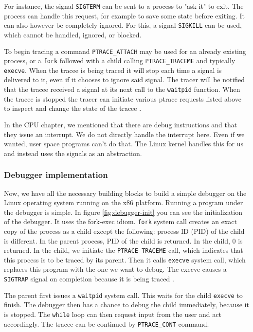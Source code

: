 For instance, the signal \texttt{SIGTERM} can be sent to a process to "ask it"
to exit. The process can handle this request, for example to save some state
before exiting. It can also however be completely ignored. For this, a signal
\texttt{SIGKILL} can be used, which cannot be handled, ignored, or blocked.

To begin tracing a command \texttt{PTRACE\_ATTACH} may be used for an already
existing process, or a \texttt{fork} followed with a child calling
\texttt{PTRACE\_TRACEME} and typically \texttt{execve}. When the tracee is
being traced it will stop each time a signal is delivered to it, even if it
chooses to ignore said signal. The tracer will be notified that the tracee
received a signal at its next call to the \texttt{waitpid} function. When the
tracee is stopped the tracer can initiate various ptrace requests listed above
to inspect and change the state of the tracee \cite{ptrace}.

In the CPU chapter, we mentioned that there are debug instructions and that
they issue an interrupt. We do not directly handle the interrupt here. Even if
we wanted, user space programs can't do that. The Linux kernel handles this for
us and instead uses the signals as an abstraction. 

\subsubsection{Debugger implementation}
Now, we have all the necessary building blocks to build a simple debugger on
the Linux operating system running on the x86 platform. Running a program under
the debugger is simple. In figure \ref{fig:debugger-init} you can see the
initialization of the debugger. It uses the fork-exec idiom. \texttt{fork}
system call creates an exact copy of the process as a child except the
following: process ID (PID) of the child is different. In the parent process,
PID of the child is returned. In the child, $0$ is returned. In the child, we
initiate the \texttt{PTRACE\_TRACEME} call, which indicates that this process
is to be traced by its parent. Then it calls \texttt{execve} system call, which
replaces this program with the one we want to debug. The execve causes a
\texttt{SIGTRAP} signal on completion because it is being traced
\cite{execve}.

The parent first issues a \texttt{waitpid} system call. This waits for the
child \texttt{execve} to finish. The debugger then has a chance to debug the
child immediately, because it is stopped. The \texttt{while} loop can then
request input from the user and act accordingly. The tracee can be continued by
\texttt{PTRACE\_CONT} command.


